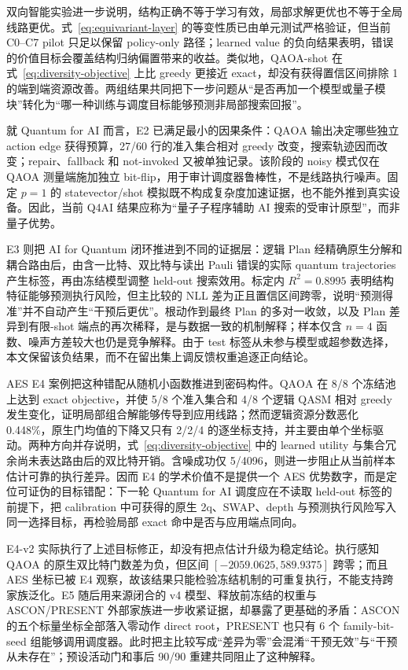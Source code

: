 \documentclass[UTF8,fontset=fandol,11pt]{ctexart}
\newcommand{\qaoa}{\ensuremath{\mathrm{QAOA}}}
\begin{document}
双向智能实验进一步说明，结构正确不等于学习有效，局部求解更优也不等于全局线路更优。式~\eqref{eq:equivariant-layer} 的等变性质已由单元测试严格验证，但当前 C0--C7 pilot 只足以保留 policy-only 路径；learned value 的负向结果表明，错误的价值目标会覆盖结构归纳偏置带来的收益。类似地，\qaoa{}-shot 在式~\eqref{eq:diversity-objective} 上比 greedy 更接近 exact，却没有获得置信区间排除 1 的端到端资源改善。两组结果共同把下一步问题从“是否再加一个模型或量子模块”转化为“哪一种训练与调度目标能够预测非局部搜索回报”。

就 Quantum for AI 而言，E2 已满足最小的因果条件：\qaoa{} 输出决定哪些独立 action edge 获得预算，27/60 行的准入集合相对 greedy 改变，搜索轨迹因而改变；repair、fallback 和 not-invoked 又被单独记录。该阶段的 noisy 模式仅在 QAOA 测量端施加独立 bit-flip，用于审计调度器鲁棒性，不是线路执行噪声。固定 $p=1$ 的 statevector/shot 模拟既不构成复杂度加速证据，也不能外推到真实设备。因此，当前 Q4AI 结果应称为“量子子程序辅助 AI 搜索的受审计原型”，而非量子优势。

E3 则把 AI for Quantum 闭环推进到不同的证据层：逻辑 Plan 经精确原生分解和耦合路由后，由含一比特、双比特与读出 Pauli 错误的实际 quantum trajectories 产生标签，再由冻结模型调整 held-out 搜索效用。标定内 $R^2=0.8995$ 表明结构特征能够预测执行风险，但主比较的 NLL 差为正且置信区间跨零，说明“预测得准”并不自动产生“干预后更优”。根动作到最终 Plan 的多对一收敛，以及 Plan 差异到有限-shot 端点的再次稀释，是与数据一致的机制解释；样本仅含 $n=4$ 函数、噪声方差较大也仍是竞争解释。由于 test 标签从未参与模型或超参数选择，本文保留该负结果，而不在留出集上调反馈权重追逐正向结论。

AES E4 案例把这种错配从随机小函数推进到密码构件。\qaoa{} 在 8/8 个冻结池上达到 exact objective，并使 5/8 个准入集合和 4/8 个逻辑 QASM 相对 greedy 发生变化，证明局部组合解能够传导到应用线路；然而逻辑资源分数恶化 0.448\%，原生门均值的下降又只有 2/2/4 的逐坐标支持，并主要由单个坐标驱动。两种方向并存说明，式~\eqref{eq:diversity-objective} 中的 learned utility 与集合冗余尚未表达路由后的双比特开销。含噪成功仅 5/4096，则进一步阻止从当前样本估计可靠的执行差异。因而 E4 的学术价值不是提供一个 AES 优势数字，而是定位可证伪的目标错配：下一轮 Quantum for AI 调度应在不读取 held-out 标签的前提下，把 calibration 中可获得的原生 2q、SWAP、depth 与预测执行风险写入同一选择目标，再检验局部 exact 命中是否与应用端点同向。

E4-v2 实际执行了上述目标修正，却没有把点估计升级为稳定结论。执行感知 \qaoa{} 的原生双比特门数差为负，但区间 $[-2059.0625,589.9375]$ 跨零；而且 AES 坐标已被 E4 观察，故该结果只能检验冻结机制的可重复执行，不能支持跨家族泛化。E5 随后用来源闭合的 v4 模型、释放前冻结的权重与 ASCON/PRESENT 外部家族进一步收紧证据，却暴露了更基础的矛盾：ASCON 的五个标量坐标全部落入零动作 direct root，PRESENT 也只有 6 个 family-bit-seed 组能够调用调度器。此时把主比较写成“差异为零”会混淆“干预无效”与“干预从未存在”；预设活动门和事后 90/90 重建共同阻止了这种解释。
\end{document}
